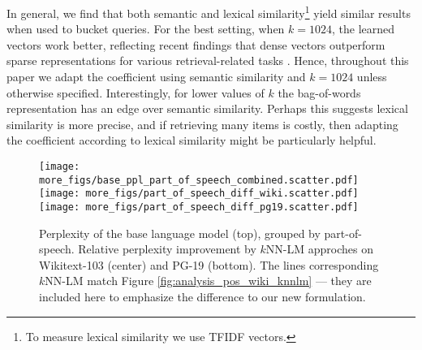 \documentclass[11pt]{article}
\begin{document}
In general, we find that both semantic and lexical similarity\footnote{To measure lexical similarity we use TFIDF vectors.} yield similar results when used to bucket queries. For the best setting, when $k=1024$, the learned vectors work better, reflecting recent findings that dense vectors outperform sparse representations for various retrieval-related tasks \cite{lee-etal-2019-latent,gao-etal-2021-coil}. Hence, throughout this paper we adapt the coefficient using semantic similarity and $k=1024$ unless otherwise specified. Interestingly, for lower values of $k$ the bag-of-words representation has an edge over semantic similarity. Perhaps this suggests lexical similarity is more precise, and if retrieving many items is costly, then adapting the coefficient according to lexical similarity might be particularly helpful. 

\begin{figure}[!ht]
\centering
\texttt{[image: more\_figs/base\_ppl\_part\_of\_speech\_combined.scatter.pdf]}
\texttt{[image: more\_figs/part\_of\_speech\_diff\_wiki.scatter.pdf]}
\texttt{[image: more\_figs/part\_of\_speech\_diff\_pg19.scatter.pdf]}
\caption{Perplexity of the base language model (top), grouped by part-of-speech. Relative perplexity improvement by $k$NN-LM approches on Wikitext-103 (center) and PG-19 (bottom). The lines corresponding $k$NN-LM match Figure \ref{fig:analysis_pos_wiki_knnlm} --- they are included here to emphasize the difference to our new formulation.}
\label{fig:pos_ppl_combined}
\end{figure}
\end{document}
